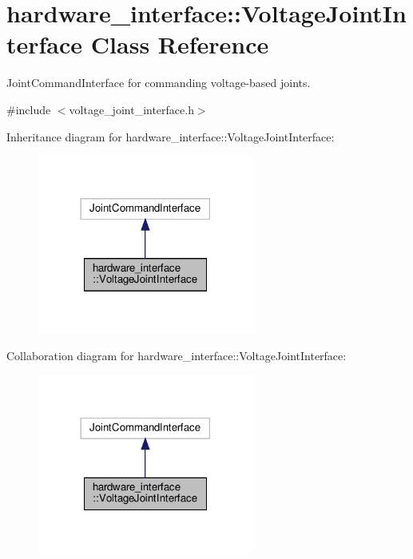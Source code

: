 \hypertarget{classhardware__interface_1_1_voltage_joint_interface}{}\section{hardware\+\_\+interface\+:\+:Voltage\+Joint\+Interface Class Reference}
\label{classhardware__interface_1_1_voltage_joint_interface}


Joint\+Command\+Interface for commanding voltage-\/based joints.  




{\ttfamily \#include $<$voltage\+\_\+joint\+\_\+interface.\+h$>$}



Inheritance diagram for hardware\+\_\+interface\+:\+:Voltage\+Joint\+Interface\+:
\nopagebreak
\begin{figure}[H]
\begin{center}
\leavevmode
\includegraphics[width=201pt]{classhardware__interface_1_1_voltage_joint_interface__inherit__graph}
\end{center}
\end{figure}


Collaboration diagram for hardware\+\_\+interface\+:\+:Voltage\+Joint\+Interface\+:
\nopagebreak
\begin{figure}[H]
\begin{center}
\leavevmode
\includegraphics[width=201pt]{classhardware__interface_1_1_voltage_joint_interface__coll__graph}
\end{center}
\end{figure}


